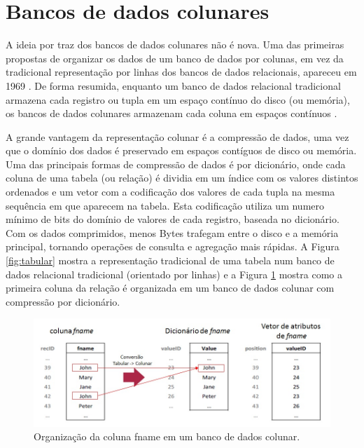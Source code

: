 \section{Bancos de dados colunares} 
\label{sec:colunar}

A ideia por traz dos bancos de dados colunares não é nova. Uma das primeiras propostas de organizar os 
dados de um banco de dados por colunas, em vez da tradicional representação por linhas dos bancos de 
dados relacionais, apareceu em 1969 \cite{estabrook1969theory}. De forma resumida, enquanto um banco de 
dados relacional tradicional armazena cada registro ou tupla em um espaço contínuo do disco (ou memória), 
os bancos de dados colunares armazenam cada coluna em espaços contínuos \cite{Abadi2009}. 

A grande vantagem da representação colunar é a compressão de dados, uma vez que o domínio dos dados 
é preservado em espaços contíguos de disco ou memória. 
Uma das principais formas de compressão de dados é por dicionário, onde cada coluna de uma 
tabela (ou relação) é dividia em um índice com os valores distintos ordenados e um vetor com a 
codificação dos valores de cada tupla na mesma sequência em que aparecem na tabela. 
Esta codificação utiliza um numero mínimo de bits do domínio de valores de cada registro, 
baseada no dicionário. Com os dados comprimidos, menos Bytes trafegam entre o disco e a 
memória principal, tornando operações de consulta e agregação mais rápidas.
A Figura \ref{fig:tabular} mostra a representação tradicional de uma tabela num banco de dados 
relacional tradicional (orientado por linhas) e a Figura \ref{fig:colunar} mostra como a 
primeira coluna da relação é organizada em um banco de dados colunar com compressão por dicionário.

\begin{figure}[!htbp]
	\centering
	\includegraphics[width=\linewidth]{./Representacao_colunar.jpg}
	\caption{Organização da coluna fname em um banco de dados colunar.}
	\label{fig:colunar}
\end{figure}



